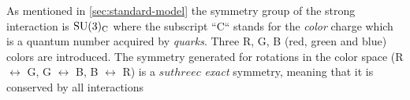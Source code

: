 As mentioned in \cref{sec:standard-model} the symmetry group of the strong
interaction is $\mathrm{SU}(3)_\mathrm{C}$ where the subscript ``C`` stands for the \emph{color}
charge which is a quantum number acquired by \emph{quarks}. Three R, G, B (red,
green and blue) colors are introduced. The symmetry generated for rotations in
the color space (R $\leftrightarrow$ G, G $\leftrightarrow$ B, B
$\leftrightarrow$ R) is a $suthreec$ \emph{exact} symmetry, meaning that it is
conserved by all interactions
